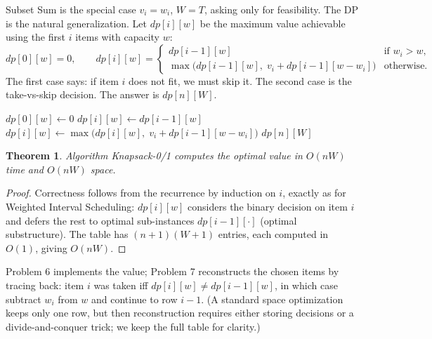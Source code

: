 \documentclass[11pt]{article}
\newtheorem{theorem}{Theorem}[section]
\begin{document}
Subset Sum is the special case $v_i = w_i$, $W = T$, asking only for feasibility. The DP is
the natural generalization. Let $\mathit{dp}[i][w]$ be the maximum value achievable using
the first $i$ items with capacity $w$:
\[
\mathit{dp}[0][w] = 0, \qquad
\mathit{dp}[i][w] =
\begin{cases}
\mathit{dp}[i-1][w] & \text{if } w_i > w,\\[2pt]
\max\bigl(\mathit{dp}[i-1][w],\; v_i + \mathit{dp}[i-1][w - w_i]\bigr) & \text{otherwise.}
\end{cases}
\]
The first case says: if item $i$ does not fit, we must skip it. The second case is the
take-vs-skip decision. The answer is $\mathit{dp}[n][W]$.

\begin{algorithm}[h]
\caption{Knapsack-0/1 (bottom-up, 2-D table)}
\begin{algorithmic}[1]
 \State $\mathit{dp}[0][w] \gets 0$ \EndFor
{}
        \State $\mathit{dp}[i][w] \gets \mathit{dp}[i-1][w]$
            \State $\mathit{dp}[i][w] \gets \max\bigl(\mathit{dp}[i][w],\; v_i + \mathit{dp}[i-1][w - w_i]\bigr)$
        \EndIf
    \EndFor
\EndFor
\State \Return $\mathit{dp}[n][W]$
\end{algorithmic}
\end{algorithm}

\begin{theorem}
Algorithm Knapsack-0/1 computes the optimal value in $O(nW)$ time and $O(nW)$ space.
\end{theorem}

\begin{proof}
Correctness follows from the recurrence by induction on $i$, exactly as for Weighted
Interval Scheduling: $\mathit{dp}[i][w]$ considers the binary decision on item $i$ and
defers the rest to optimal sub-instances $\mathit{dp}[i-1][\cdot]$ (optimal substructure).
The table has $(n+1)(W+1)$ entries, each computed in $O(1)$, giving $O(nW)$.
\end{proof}

Problem 6 implements the value; Problem 7 reconstructs the chosen items by tracing back:
item $i$ was taken iff $\mathit{dp}[i][w] \ne \mathit{dp}[i-1][w]$, in which case subtract
$w_i$ from $w$ and continue to row $i-1$. (A standard space optimization keeps only one
row, but then reconstruction requires either storing decisions or a divide-and-conquer
trick; we keep the full table for clarity.)
\end{document}
